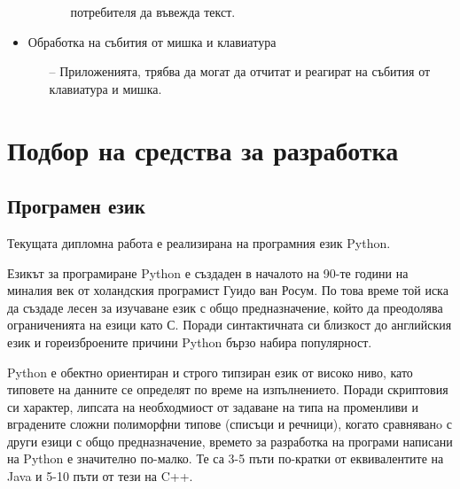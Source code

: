 \begin{itemize}
\begin{itemize}
\begin{itemize}
                                                        потребителя да въвежда
                                                        текст.
                                        \end{itemize}
                        \end{itemize}
                \item Обработка на събития от мишка и клавиатура
                        \begin{itemize}
                                \item[--] Приложенията, трябва да могат да
                                        отчитат и реагират на събития от 
                                        клавиатура и мишка.
                        \end{itemize}
        \end{itemize}

\section{Подбор на средства за разработка}
        \subsection{Програмен език}

                Текущата дипломна работа е реализирана на програмния език 
                Python.
                \newline

                Езикът за програмиране Python е създаден в началото на 90-те 
                години на миналия век от холандския програмист Гуидо ван Росум.
                По това време той иска да създаде лесен за изучаване език с 
                общо предназначение, който да преодолява ограниченията на езици
                като С. Поради синтактичната си близкост до английския език и 
                гореизброените причини Python бързо набира популярност. 

                Python е обектно ориентиран и строго типзиран език от високо
                ниво, като типовете на данните се определят по време на 
                изпълнението. Поради скриптовия си характер, липсата на 
                необходмиост от задаване на типа на променливи и вградените 
                сложни полиморфни типове (списъци и речници), когато сравняванo
                с други езици с общо предназначение, времето за разработка на 
                програми написани на Python е значително по-малко. Те са 3-5 
                пъти по-кратки от еквивалентите на Java и 5-10 пъти от тези на 
                C++. \cite{py-comp}

